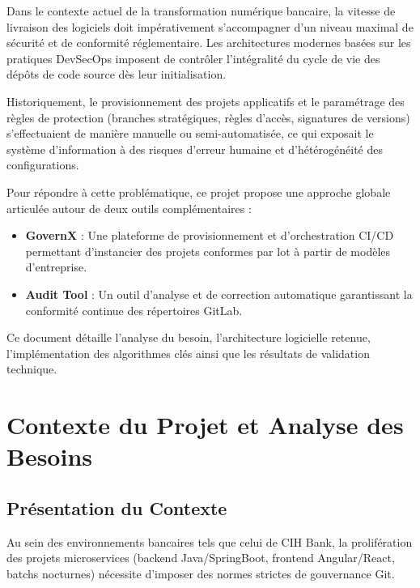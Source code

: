 \documentclass[12pt,a4paper]{report}
\begin{document}
Dans le contexte actuel de la transformation numérique bancaire, la vitesse de livraison des logiciels doit impérativement s'accompagner d'un niveau maximal de sécurité et de conformité réglementaire. Les architectures modernes basées sur les pratiques DevSecOps imposent de contrôler l'intégralité du cycle de vie des dépôts de code source dès leur initialisation.

Historiquement, le provisionnement des projets applicatifs et le paramétrage des règles de protection (branches stratégiques, règles d'accès, signatures de versions) s'effectuaient de manière manuelle ou semi-automatisée, ce qui exposait le système d'information à des risques d'erreur humaine et d'hétérogénéité des configurations.

Pour répondre à cette problématique, ce projet propose une approche globale articulée autour de deux outils complémentaires :
\begin{itemize}
    \item \textbf{GovernX} : Une plateforme de provisionnement et d'orchestration CI/CD permettant d'instancier des projets conformes par lot à partir de modèles d'entreprise.
    \item \textbf{Audit Tool} : Un outil d'analyse et de correction automatique garantissant la conformité continue des répertoires GitLab.
\end{itemize}

Ce document détaille l'analyse du besoin, l'architecture logicielle retenue, l'implémentation des algorithmes clés ainsi que les résultats de validation technique.

\chapter{Contexte du Projet et Analyse des Besoins}

\section{Présentation du Contexte}
Au sein des environnements bancaires tels que celui de CIH Bank, la prolifération des projets microservices (backend Java/SpringBoot, frontend Angular/React, batchs nocturnes) nécessite d'imposer des normes strictes de gouvernance Git.
\end{document}
